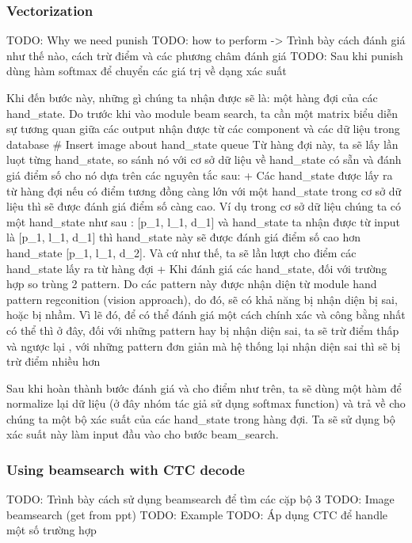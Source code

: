     \subsubsection{ Vectorization }
      TODO: Why we need punish
      TODO: how to perform -> Trình bày cách đánh giá như thế nào, cách trừ điểm và các phương châm đánh giá
      TODO: Sau khi punish dùng hàm softmax để chuyển các giá trị về dạng xác suất

      Khi đến bước này, những gì chúng ta nhận được sẽ là: một hàng đợi của các hand_state.
      Do trước khi vào module beam search, ta cần một matrix biểu diễn sự tương quan giữa các output nhận được từ các component và các dữ liệu trong database
      # Insert image about hand_state queue
      Từ hàng đợi này, ta sẽ lấy lần luọt từng hand_state, so sánh nó với cơ sở dữ liệu về hand_state có sẵn 
      và đánh giá điểm số cho nó dựa trên các nguyên tắc sau:
        + Các hand_state được lấy ra từ hàng đợi nếu có điểm tương đồng càng lớn với một hand_state
        trong cơ sở dữ liệu thì sẽ được đánh giá điểm số càng cao. Ví dụ trong cơ sở dữ liệu chúng ta
        có một hand_state như sau : [p_1, l_1, d_1] và hand_state ta nhận được từ input là [p_1, l_1, d_1] thì hand_state này sẽ
        được đánh giá điểm số cao hơn hand_state [p_1, l_1, d_2]. Và cứ như thế, ta sẽ lần lượt cho điểm các hand_state lấy ra từ hàng đợi
        + Khi đánh giá các hand_state, đối với trường hợp so trùng 2 pattern. Do các pattern này được nhận diện từ module
        hand pattern regconition (vision approach), do đó, sẽ có khả năng bị nhận diện bị sai, hoặc bị nhầm. Vì lẽ đó, để có thể
        đánh giá một cách chính xác và công bằng nhất có thể thì ở đây, đối với những pattern hay bị nhận diện sai, ta sẽ trừ điểm thấp và ngược lại
        , với những pattern đơn giản mà hệ thống lại nhận diện sai thì sẽ bị trừ điểm nhiều hơn
      
      Sau khi hoàn thành bước đánh giá và cho điểm như trên, ta sẽ dùng một hàm để normalize
      lại dữ liệu (ở đây nhóm tác giả sử dụng softmax function) và trả về cho chúng ta một bộ xác suất của các hand_state trong hàng đợi. Ta sẽ sử dụng bộ xác suất này
      làm input đầu vào cho bước beam_search.
    \subsubsection{ Using beamsearch with CTC decode }

      TODO: Trình bày cách sử dụng beamsearch để tìm các cặp bộ 3
      TODO: Image beamsearch (get from ppt)
      TODO: Example
      TODO: Áp dụng CTC để handle một số trường hợp
      
